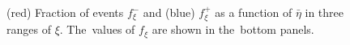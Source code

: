 \begin{figure}[h!]
\begin{subfigure}{.49\textwidth}
	\end{subfigure}
	\hfill
	\begin{minipage}{.47\textwidth}
		\caption{(red) Fraction of events $f_{\xi}^-$ and (blue) $f_{\xi}^+$  as a function of $\bar{\eta}$ in three ranges of $\xi$. The~values of $f_{\xi}$ are shown in the~bottom panels.}
		\label{fig:xi_correction_eta}
	\end{minipage}
	\vspace{-2.8cm}
\end{figure}